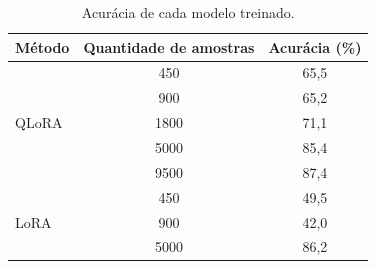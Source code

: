\begin{table}[ht]
    \caption{\small Acurácia de cada modelo treinado.}
    \centering
    \begin{tabular}{l|c|c}
        \hline
        Método                      & Quantidade de amostras & Acurácia (\%) \\ \hline
        \multirow{5}{*}{\ac{QLoRA}} & 450                    & 65,5          \\
                                    & 900                    & 65,2          \\
                                    & 1800                   & 71,1          \\
                                    & 5000                   & 85,4          \\
                                    & 9500                   & 87,4          \\ \hline
        \multirow{3}{*}{\ac{LoRA}}  & 450                    & 49,5          \\
                                    & 900                    & 42,0          \\
                                    & 5000                   & 86,2          \\ \hline
    \end{tabular}
    \label{tab:training_accuracies}
\end{table}
